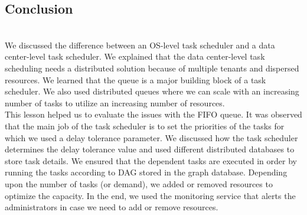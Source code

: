 \subsection{Conclusion}\label{ohsGiKELNrj5KsyIE0YsB}
\\
We discussed the difference between an OS-level task scheduler and a data center-level task scheduler. We explained that the data center-level task scheduling needs a distributed solution because of multiple tenants and dispersed resources. We learned that the queue is a major building block of a task scheduler. We also used distributed queues where we can scale with an increasing number of tasks to utilize an increasing number of resources.
\\
This lesson helped us to evaluate the issues with the FIFO queue. It was observed that the main job of the task scheduler is to set the priorities of the tasks for which we used a delay tolerance parameter. We discussed how the task scheduler determines the delay tolerance value and used different distributed databases to store task details. We ensured that the dependent tasks are executed in order by running the tasks according to DAG stored in the graph database. Depending upon the number of tasks (or demand), we added or removed resources to optimize the capacity. In the end, we used the monitoring service that alerts the administrators in case we need to add or remove resources.

